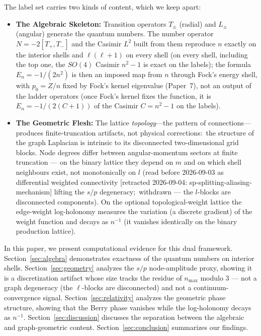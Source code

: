 \documentclass[aps,pra,twocolumn,superscriptaddress,longbibliography]{revtex4-2}
\begin{document}
The label set carries two kinds of content, which we keep apart:
\begin{itemize}
\item \textbf{The Algebraic Skeleton:} Transition operators $T_\pm$ (radial) and $L_\pm$ (angular) generate the quantum numbers. The number operator $N = -2[T_+,T_-]$ and the Casimir $L^2$ built from them reproduce $n$ exactly on the interior shells and $\ell(\ell+1)$ on every shell (on every shell, including the top one, the $SO(4)$ Casimir $n^2-1$ is exact on the labels); the formula $E_n = -1/(2n^2)$ is then an imposed map from $n$ through Fock's energy shell, with $p_0 = Z/n$ fixed by Fock's kernel eigenvalue (Paper~7), not an output of the ladder operators (once Fock's kernel fixes the function, it is $E_n = -1/(2(C+1))$ of the Casimir $C = n^2-1$ on the labels).
\item \textbf{The Geometric Flesh:} The lattice \textit{topology}---the pattern of connections---produces finite-truncation artifacts, not physical corrections:\ the structure of the graph Laplacian is intrinsic to its disconnected two-dimensional grid blocks. Node degrees differ between angular-momentum sectors at finite truncation --- on the binary lattice they depend on $m$ and on which shell neighbours exist, not monotonically on $l$ (read before 2026-09-03 as differential weighted connectivity [retracted 2026-09-04: sp-splitting-aliasing-mechanism] lifting the $s/p$ degeneracy;\ withdrawn --- the $l$-blocks are disconnected components). On the optional topological-weight lattice the edge-weight log-holonomy measures the variation (a discrete gradient) of the weight function and decays as $n^{-1}$ (it vanishes identically on the binary production lattice).
\end{itemize}

In this paper, we present computational evidence for this dual framework. Section~\ref{sec:algebra} demonstrates exactness of the quantum numbers on interior shells. Section~\ref{sec:geometry} analyzes the $s/p$ node-amplitude proxy, showing it is a discretization artifact whose size tracks the residue of $n_{\max}$ modulo $3$ --- not a graph degeneracy (the $\ell$-blocks are disconnected) and not a continuum-convergence signal. Section~\ref{sec:relativity} analyzes the geometric phase structure, showing that the Berry phase vanishes while the log-holonomy decays as $n^{-1}$. Section~\ref{sec:discussion} discusses the separation between the algebraic and graph-geometric content. Section~\ref{sec:conclusion} summarizes our findings.
\end{document}
